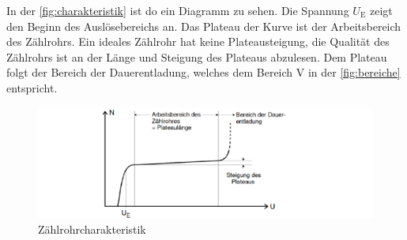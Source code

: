 In der \autoref{fig:charakteristik} ist do ein Diagramm zu sehen. 
Die Spannung $U_{\text{E}}$ zeigt den Beginn des Auslösebereichs an. 
Das Plateau der Kurve ist der Arbeitsbereich des Zählrohrs.
Ein ideales Zählrohr hat keine Plateausteigung, die Qualität des Zählrohrs ist an der Länge und Steigung des Plateaus abzulesen.
Dem Plateau folgt der Bereich der Dauerentladung, welches dem Bereich V in der \autoref{fig:bereiche} entspricht.
\begin{figure}
    \centering
    \includegraphics[width=\textwidth]{content/charakteristik.pdf}
    \caption{Zählrohrcharakteristik \cite{anleitung}}
    \label{fig:charakteristik}
\end{figure}